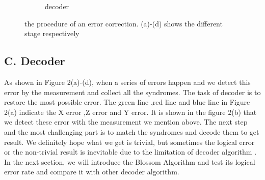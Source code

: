 \documentclass[
    a4paper, %
    10pt, %
    unnumberedsections, %
    twoside, %
]{LTJournalArticle}
\begin{document}
\begin{figure}[htbp]
\begin{subfigure}[b]{0.45\linewidth}
        \caption{decoder}
        \label{fig:subfig4}
    \end{subfigure}
    \caption{the procedure of an error correction. (a)-(d) shows the different stage respectively}
    \label{fig:fourfigs}
    \vspace{-0.4cm}
\end{figure}
\subsection{C. Decoder}
As shown in Figure 2(a)-(d), when a series of errors happen and we detect this error by the measurement and collect all the syndromes. The task of decoder is to restore the most possible error. The green line ,red line and blue line in Figure 2(a) indicate the X error ,Z error and Y error. It is shown in the figure 2(b) that we detect these error with the measurement we mention above. The next step and the most challenging part is to match the syndromes and decode them to get result. We definitely hope what we get is trivial, but sometimes the logical error or the non-trivial result is inevitable due to the limitation of decoder algorithm \cite{9}. In the next section, we will introduce the Blossom Algorithm and test its logical error rate and compare it with other decoder algorithm.

\end{document}
